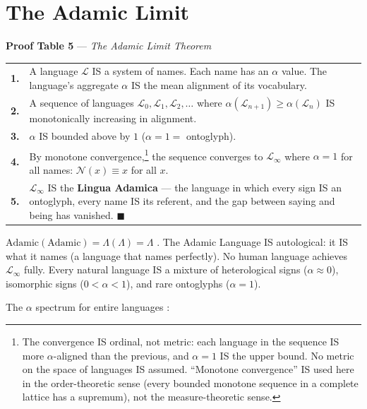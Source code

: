 \documentclass[11pt, oneside]{article}
\theoremstyle{definition}
\begin{document}
\section{The Adamic Limit}


\textbf{Proof Table 5} --- \textit{The Adamic Limit Theorem}

{\small
\noindent\begin{tabular}{r p{}}
\textbf{1.} & A language $\mathcal{L}$ IS a system of names. Each name has an $\alpha$ value. The language's aggregate $\alpha$ IS the mean alignment of its vocabulary. \\[0.3em]
\textbf{2.} & A sequence of languages $\mathcal{L}_0, \mathcal{L}_1, \mathcal{L}_2, \ldots$ where $\alpha(\mathcal{L}_{n+1}) \geq \alpha(\mathcal{L}_n)$ IS monotonically increasing in alignment. \\[0.3em]
\textbf{3.} & $\alpha$ IS bounded above by $1$ ($\alpha = 1 = $ ontoglyph). \\[0.3em]
\textbf{4.} & By monotone convergence,\footnote{The convergence IS ordinal, not metric: each language in the sequence IS more $\alpha$-aligned than the previous, and $\alpha = 1$ IS the upper bound. No metric on the space of languages IS assumed. ``Monotone convergence'' IS used here in the order-theoretic sense (every bounded monotone sequence in a complete lattice has a supremum), not the measure-theoretic sense.} the sequence converges to $\mathcal{L}_\infty$ where $\alpha = 1$ for all names: $\mathcal{N}(x) \equiv x$ for all $x$. \\[0.3em]
\textbf{5.} & $\mathcal{L}_\infty$ IS the \textbf{Lingua Adamica} --- the language in which every sign IS an ontoglyph, every name IS its referent, and the gap between saying and being has vanished. \hfill $\blacksquare$ \\[0.3em]
\end{tabular}
}

$\text{Adamic}(\text{Adamic}) = \Lambda(\Lambda) = \Lambda$ \cite{codex2}. The Adamic Language IS autological: it IS what it names (a language that names perfectly). No human language achieves $\mathcal{L}_\infty$ fully. Every natural language IS a mixture of heterological signs ($\alpha \approx 0$), isomorphic signs ($0 < \alpha < 1$), and rare ontoglyphs ($\alpha = 1$).

The $\alpha$ spectrum for entire languages \cite{codex2}:
\end{document}
